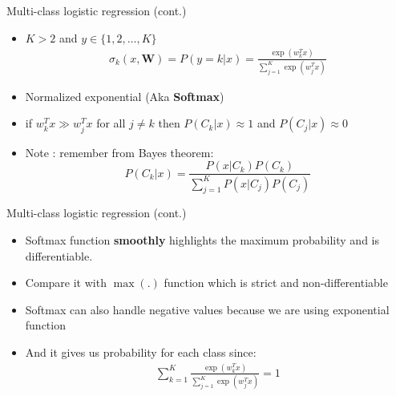\documentclass[serif, aspectratio=169]{beamer}
\begin{document}
    \begin{frame}{Multi-class logistic regression (cont.)}
        \begin{itemize}
            \item $K > 2$ and $y \in \{1,2,\dots,K\}$
            \begin{align*}
                \sigma _k(x, \mathbf{W}) = P(y=k|x) = \frac{\exp{(w^T_kx)}}{\sum_{j=1}^{K}\exp{(w_j^Tx)}}
            \end{align*}
            \item Normalized exponential (Aka \textbf{Softmax})

            \item if $w_k^Tx \gg w_j^Tx$ for all $j \neq k$ then $P(C_k|x) \approx 1$ and $P(C_j|x) \approx 0$
            \item Note : remember from Bayes theorem:
            \[
                P(C_k|x) = \frac{P(x|C_k)P(C_k)}
                {\sum_{j=1}^{K}P(x|C_j)P(C_j)}
            \]

        \end{itemize}
    \end{frame}
    \begin{frame}{Multi-class logistic regression (cont.)}
        \begin{itemize}
            \item Softmax function \textbf{smoothly} highlights the maximum probability and is differentiable.
            \item Compare it with $\max (.)$ function which is strict and non-differentiable
            \item Softmax can also handle negative values because we are using exponential function
            \item And it gives us probability for each class since:
            \begin{align*}
                \displaystyle \sum _{k=1}^{K} \frac{\exp (w_k^Tx)}{\sum _{j=1}^{K} \exp (w_j^Tx) } = 1
            \end{align*}
        \end{itemize}
    \end{frame}
\end{document}
